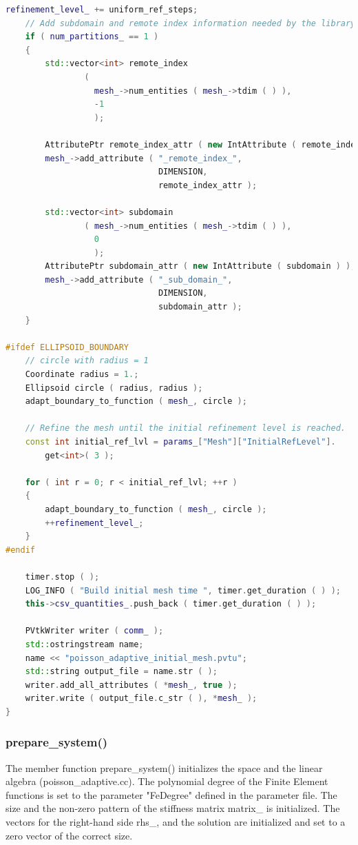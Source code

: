 \documentclass[a4paper, 11pt, twoside]{article}
\begin{document}
\begin{lstlisting}[language=C++, basicstyle={\footnotesize, \ttfamily}, keywordstyle=\color{blue}, numbers=none, tabsize=4]
    refinement_level_ += uniform_ref_steps;
    // Add subdomain and remote index information needed by the library
    if ( num_partitions_ == 1 )
    {
        std::vector<int> remote_index
                (
                  mesh_->num_entities ( mesh_->tdim ( ) ),
                  -1
                  );

        AttributePtr remote_index_attr ( new IntAttribute ( remote_index ) );
        mesh_->add_attribute ( "_remote_index_",
                               DIMENSION,
                               remote_index_attr );

        std::vector<int> subdomain
                ( mesh_->num_entities ( mesh_->tdim ( ) ),
                  0
                  );
        AttributePtr subdomain_attr ( new IntAttribute ( subdomain ) );
        mesh_->add_attribute ( "_sub_domain_",
                               DIMENSION,
                               subdomain_attr );
    }

#ifdef ELLIPSOID_BOUNDARY
    // circle with radius = 1
    Coordinate radius = 1.;
    Ellipsoid circle ( radius, radius );
    adapt_boundary_to_function ( mesh_, circle );

    // Refine the mesh until the initial refinement level is reached.
    const int initial_ref_lvl = params_["Mesh"]["InitialRefLevel"].
        get<int>( 3 );

    for ( int r = 0; r < initial_ref_lvl; ++r )
    {
        adapt_boundary_to_function ( mesh_, circle );
        ++refinement_level_;
    }
#endif

    timer.stop ( );
    LOG_INFO ( "Build initial mesh time ", timer.get_duration ( ) );
    this->csv_quantities_.push_back ( timer.get_duration ( ) );

    PVtkWriter writer ( comm_ );
    std::ostringstream name;
    name << "poisson_adaptive_initial_mesh.pvtu";
    std::string output_file = name.str ( );
    writer.add_all_attributes ( *mesh_, true );
    writer.write ( output_file.c_str ( ), *mesh_ );
}
\end{lstlisting}
\subsubsection{prepare\_system()}
The member function prepare\_system() initializes the space and the linear algebra (poisson\_adaptive.cc). 
The polynomial degree of the Finite Element functions is set to the parameter "FeDegree" defined in the parameter file. 
The size and the non-zero pattern of the stiffness matrix matrix\_ is initialized. 
The vectors for the right-hand side rhs\_, and the solution are initialized and set to a zero vector of the correct size.
\end{document}
